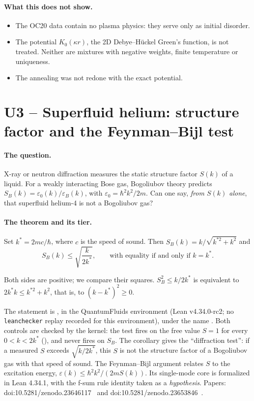 \paragraph{What this does not show.}
\begin{itemize}
\item The OC20 data contain no plasma physics: they serve only as initial disorder.
\item The potential $K_0(\kappa r)$, the 2D Debye--Hückel Green's function, is not treated. Neither are mixtures with
negative weights, finite temperature or uniqueness.
\item The annealing was not redone with the exact potential.
\end{itemize}

\section[U3 -- Superfluid helium and the Feynman--Bijl test]{U3 -- Superfluid helium: structure factor and the Feynman--Bijl test}\label{ch5:U3}

\paragraph{The question.} X-ray or neutron diffraction measures the static structure factor $S(k)$
of a liquid. For a weakly interacting Bose gas, Bogoliubov theory predicts
$S_B(k)=\varepsilon_0(k)/\varepsilon_B(k)$, with $\varepsilon_0=\hbar^2k^2/2m$. Can one say, \emph{from
$S(k)$ alone}, that superfluid helium-4 is not a Bogoliubov gas?

\paragraph{The theorem and its tier.} Set $k^*=2mc/\hbar$, where $c$ is the speed of sound. Then
$S_B(k)=k/\sqrt{k^{*2}+k^2}$ and
\[S_B(k)\le\sqrt{\frac{k}{2k^*}},\qquad\text{with equality if and only if }k=k^* .\]
\begin{humanproof}
Both sides are positive; we compare their squares. $S_B^2\le k/2k^*$ is equivalent to
$2k^*k\le k^{*2}+k^2$, that is, to $(k-k^*)^2\ge0$.
\end{humanproof}
\begingroup\sloppy The statement is \tierAs{}, in the QuantumFluids environment (Lean v4.34.0-rc2; no \texttt{leanchecker} replay recorded for this environment), under the name
. Both controls are checked by the kernel: the test fires on the free value $S=1$
for every $0<k<2k^*$ (), and never fires on $S_B$. The corollary
 gives the ``diffraction test'': if a measured $S$ exceeds
$\sqrt{k/2k^*}$, this $S$ is not the structure factor of a Bogoliubov gas with that speed of sound.
The Feynman--Bijl argument relates $S$ to the excitation energy, $\varepsilon(k)\le\hbar^2k^2/(2mS(k))$. Its
single-mode core is formalized in Lean 4.34.1, with the f-sum rule identity taken as a
\emph{hypothesis}. Papers: doi:10.5281/zenodo.23646117~\cite{ch3-bsk} and
doi:10.5281/zenodo.23653846~\cite{ch3-fb}.\par\endgroup

